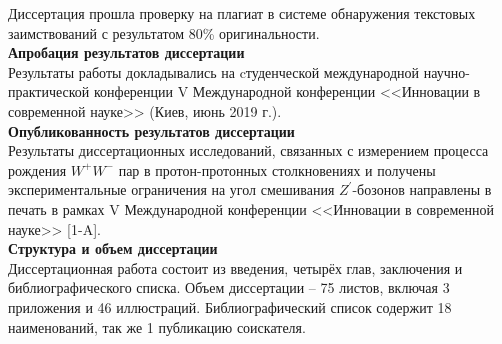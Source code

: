 Диссертация прошла проверку на плагиат в системе обнаружения текстовых заимствований с результатом 80\% оригинальности.
\\

\textbf{Апробация результатов диссертации}\\

Результаты работы докладывались на cтуденческой международной научно-практической конференции V Международной конференции <<Инновации в современной науке>> (Киев, июнь 2019 г.).
\\

\textbf{Опубликованность результатов диссертации}\\

Результаты диссертационных исследований, связанных с измерением процесса рождения ${W}^{+}{W}^{-}$ пар в протон-протонных столкновениях и получены экспериментальные ограничения на угол смешивания ${Z}^{\prime}$-бозонов направлены в печать в рамках V Международной конференции <<Инновации в современной науке>> [1-A].
\\

\textbf{Структура и объем диссертации}\\

Диссертационная работа состоит из введения, четырёх глав, заключения и библиографического списка. Объем диссертации – 75 листов, включая 3 приложения и 46 иллюстраций. Библиографический список содержит 18 наименований, так же 1 публикацию соискателя.
